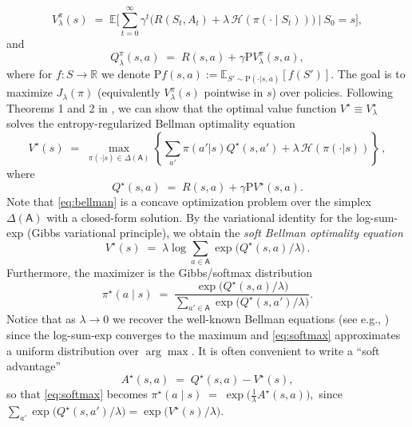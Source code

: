 \documentclass{article}
\theoremstyle{definition}
\theoremstyle{remark}
\theoremstyle{plain}
\newcommand{\E}{\mathbb{E}}
\newcommand{\MKQ}{\mathrm{P}}
\def\eqsp{\,}
\def\rset{\mathbb{R}}
\numberwithin{equation}{section}
\begin{document}
\[
V_\lambda^\pi(s) \;=\; \E\Bigg[\sum_{t=0}^\infty \gamma^t \Big(R(S_t,A_t) + \lambda\,\mathcal{H}(\pi(\cdot\mid S_t))\Big)\ \Big|\ S_0=s\Bigg],
\]
and
\[
Q_\lambda^\pi(s,a) \;=\; R(s,a)+\gamma \MKQ V_\lambda^\pi(s, a),
\]
where for $f: S \to \rset$ we denote $\MKQ f(s,a) := \E_{S' \sim \MKQ(\cdot | s,a)}[f(S')]$. 
The goal is to maximize $J_\lambda(\pi)$ (equivalently $V_\lambda^\pi(s)$ pointwise in $s$) over policies. Following Theorems 1 and 2 in \cite{pmlr-v70-haarnoja17a},  we can show that
the optimal value function $V^\star\equiv V^\star_\lambda$ solves the entropy-regularized Bellman optimality equation
\begin{equation}
\label{eq:bellman}
V^\star(s) \;=\; \max_{\pi(\cdot|s)\in\Delta(\mathsf{A})}  \left\{\sum_{a'} \pi(a'|s)  Q^\star(s,a') + \lambda\, \mathcal{H}(\pi(\cdot|s))\right\}\eqsp,
\end{equation}
where 
\begin{equation}
\label{eq:QR}
Q^\star(s,a) \;=\; R(s,a) + \gamma \MKQ  V^\star(s,a).
\end{equation}
Note that \eqref{eq:bellman} is a concave optimization problem over the simplex $\Delta(\mathsf{A})$ with a closed-form solution. 
By the variational identity for the log-sum-exp (Gibbs variational principle),
we obtain the \emph{soft Bellman optimality equation}
\begin{equation}
\label{eq:soft-bellman}
V^\star(s) \;=\; \lambda \log \sum_{a\in\mathsf{A}} \exp\!\Big(Q^\star(s,a)/\lambda\Big)\eqsp.
\end{equation}
Furthermore, the maximizer is the Gibbs/softmax distribution
\begin{equation}
\label{eq:softmax}
\pi^\star(a\mid s) \;=\; 
\frac{\exp\!\big(Q^\star(s,a)/\lambda\big)}{\sum_{a'\in\mathsf{A}}\exp\!\big(Q^\star(s,a')/\lambda\big)}.
\end{equation}
Notice that as $\lambda \to 0$ we recover the well-known Bellman equations (see e.g., \cite{sutton2018reinforcement}) since the log-sum-exp converges to the maximum and \eqref{eq:softmax} approximates a uniform distribution over $\arg \max$. 
It is often convenient to write a ``soft advantage''
\begin{equation}
\label{eq: soft advantage}
A^\star(s,a) \;=\; Q^\star(s,a) - V^\star(s),
\end{equation}
so that \eqref{eq:softmax} becomes
\(
\pi^\star(a\mid s) \;=\; \exp\!\Big(\tfrac{1}{\lambda}A^\star(s,a)\Big),
\)
since
\(\sum_{a'}\exp\!\big(Q^\star(s,a')/\lambda\big) = \exp\!\big(V^\star(s)/\lambda\big)\).
\end{document}
